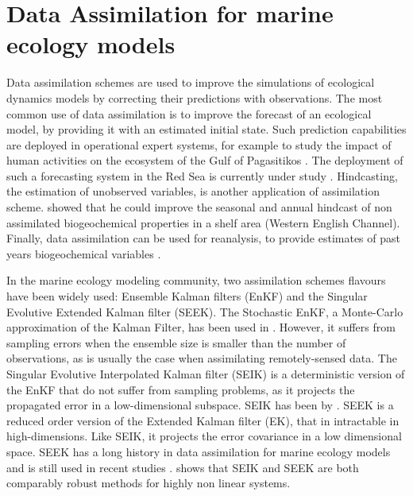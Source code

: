 \section{Data Assimilation for marine ecology models}

Data assimilation schemes are used to improve the simulations of ecological dynamics models by correcting their predictions with observations. The most common use of data assimilation is to improve the forecast of an ecological model, by providing it with an estimated initial state. Such prediction capabilities are deployed in operational expert systems, for example to study the impact of human activities on the ecosystem of the Gulf of Pagasitikos \cite{Korres2012}. The deployment of such a forecasting system in the Red Sea is currently under study \cite{Triantafyllou2014}. Hindcasting, the estimation of unobserved variables, is another application of assimilation scheme. \cite{Ciavatta2011}  showed that he could improve the seasonal and annual hindcast of non assimilated biogeochemical properties in a shelf area (Western English Channel). Finally, data assimilation can be used for reanalysis, to provide estimates of past years biogeochemical variables \cite{Fontana2013}. 

In the marine ecology modeling community, two assimilation schemes flavours have been widely used: Ensemble Kalman filters (EnKF) and the Singular Evolutive Extended Kalman filter (SEEK). The Stochastic EnKF, a Monte-Carlo approximation of the Kalman Filter, has been used in \cite{Ciavatta2011, Ciavatta2014}. However, it suffers from sampling errors when the ensemble size is smaller than the number of observations, as is usually the case when assimilating remotely-sensed data. The Singular Evolutive Interpolated Kalman filter (SEIK) is a deterministic version of the EnKF that do not suffer from sampling problems, as it projects the propagated error in a low-dimensional subspace. SEIK has been by \cite{Triantafyllou2012, Korres2012}. SEEK is a reduced order version of the Extended Kalman filter (EK), that in intractable in high-dimensions. Like SEIK, it projects the error covariance in a low dimensional space. SEEK has a long history in data assimilation for marine ecology models and is still used in recent studies \cite{Fontana2013, Korres2012, Butenschon2012}. \cite{Korres2012} shows that SEIK and SEEK are both comparably robust methods for highly non linear systems.

